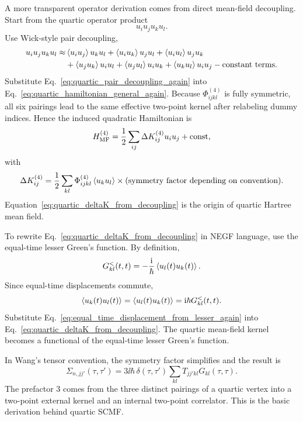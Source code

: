 A more transparent operator derivation comes from direct mean-field decoupling. Start from the quartic operator product
\begin{equation}
    u_i u_j u_k u_l.
\end{equation}
Use Wick-style pair decoupling,
\begin{align}
    u_i u_j u_k u_l
    \approx
    &\left\langle u_i u_j \right\rangle u_k u_l
    + \left\langle u_i u_k \right\rangle u_j u_l
    + \left\langle u_i u_l \right\rangle u_j u_k \\
    &+ \left\langle u_j u_k \right\rangle u_i u_l
    + \left\langle u_j u_l \right\rangle u_i u_k
    + \left\langle u_k u_l \right\rangle u_i u_j
    - \text{constant terms}.
    \label{eq:quartic_pair_decoupling_again}
\end{align}
Substitute Eq.~\eqref{eq:quartic_pair_decoupling_again} into Eq.~\eqref{eq:quartic_hamiltonian_general_again}. Because $\Phi^{(4)}_{ijkl}$ is fully symmetric, all six pairings lead to the same effective two-point kernel after relabeling dummy indices. Hence the induced quadratic Hamiltonian is
\begin{equation}
    H^{(4)}_{\rm MF}
    =
    \frac{1}{2}\sum_{ij}\Delta K^{(4)}_{ij}u_i u_j + \mathrm{const},
\end{equation}
with
\begin{equation}
    \Delta K^{(4)}_{ij}
    =
    \frac{1}{2}\sum_{kl}\Phi^{(4)}_{ijkl}\left\langle u_k u_l \right\rangle
    \times \text{(symmetry factor depending on convention)}.
    \label{eq:quartic_deltaK_from_decoupling}
\end{equation}
Equation~\eqref{eq:quartic_deltaK_from_decoupling} is the origin of quartic Hartree mean field.

To rewrite Eq.~\eqref{eq:quartic_deltaK_from_decoupling} in NEGF language, use the equal-time lesser Green's function. By definition,
\begin{equation}
    G^<_{kl}(t,t) = -\frac{\mathrm{i}}{\hbar}\left\langle u_l(t)u_k(t) \right\rangle.
\end{equation}
Since equal-time displacements commute,
\begin{equation}
    \left\langle u_k(t)u_l(t) \right\rangle = \left\langle u_l(t)u_k(t) \right\rangle = \mathrm{i}\hbar G^<_{kl}(t,t).
    \label{eq:equal_time_displacement_from_lesser_again}
\end{equation}
Substitute Eq.~\eqref{eq:equal_time_displacement_from_lesser_again} into Eq.~\eqref{eq:quartic_deltaK_from_decoupling}. The quartic mean-field kernel becomes a functional of the equal-time lesser Green's function.

In Wang's tensor convention, the symmetry factor simplifies and the result is
\begin{equation}
    \Sigma_{n,jj'}(\tau,\tau') = 3\ii\hbar\,\delta(\tau,\tau')\sum_{kl}T_{jj'kl}G_{kl}(\tau,\tau).
    \label{eq:wang_quartic_scmf_again}
\end{equation}
The prefactor $3$ comes from the three distinct pairings of a quartic vertex into a two-point external kernel and an internal two-point correlator. This is the basic derivation behind quartic SCMF.

